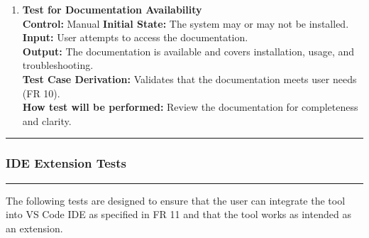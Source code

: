 \documentclass[12pt, titlepage]{article}
\newcommand{\colorrule}{\textcolor{BlueViolet}{\rule{\linewidth}{2pt}}}
\begin{document}
\begin{enumerate}[label={\bf \textcolor{Maroon}{test-FR-DA-\arabic*}}, wide=0pt, font=\itshape]
  \item \textbf{Test for Documentation Availability}\\[2mm]
    \textbf{Control:} Manual
    \textbf{Initial State:} The system may or may not be installed.\\
    \textbf{Input:} User attempts to access the documentation.\\
    \textbf{Output:} The documentation is available and covers installation, usage, and troubleshooting.\\[2mm]
    \textbf{Test Case Derivation:} Validates that the documentation meets user needs (FR 10).\\[2mm]
    \textbf{How test will be performed:} Review the documentation for completeness and clarity.
\end{enumerate}

\noindent
\colorrule

\subsubsection{IDE Extension Tests}
\colorrule

\medskip

\noindent
The following tests are designed to ensure that the user can integrate the tool into VS Code IDE as specified in FR 11 and that the tool works as intended as an extension.
\end{document}
